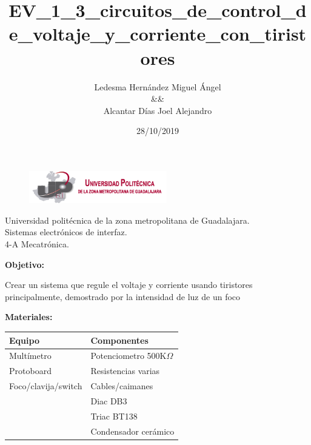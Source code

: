 \documentclass[letterpaper]{article}
\title{EV\_1\_3\_circuitos\_de\_control\_de\_voltaje\_y\_corriente\_con\_tiristores}
\author{Ledesma Hernández Miguel Ángel \\ \&\& \\ Alcantar Días Joel Alejandro}
\date{28/10/2019}
\begin{document}
\begin{figure}[t]
    \includegraphics[width=6cm]{img/logo.png}
\end{figure}
\vspace{2cm}
\maketitle
\vspace{12cm}
\begin{center}
   Universidad politécnica de la zona metropolitana de Guadalajara.\\
Sistemas electrónicos de interfaz.\\
4-A Mecatrónica.\\ 
\end{center}
\newpage

\begin{LARGE}
\textbf{Objetivo:}\\
\end{LARGE}

Crear un sistema que regule el voltaje y corriente usando tiristores principalmente, demostrado por la intensidad de luz de un foco\\


\begin{LARGE}
\textbf{Materiales:}\\
\end{LARGE}

\begin{table}[htbp]
\begin{tabular}{|l|l|}
\hline
{\color[HTML]{3166FF} \textbf{Equipo}} & {\color[HTML]{CB0000} \textbf{Componentes}} \\ \hline
Multímetro                             & Potenciometro 500K$\Omega$                  \\ \hline
Protoboard                             & Resistencias varias                         \\ \hline
Foco/clavija/switch                    & Cables/caimanes                             \\ \hline
                                       & Diac DB3                                    \\ \hline
                                       & Triac BT138                                 \\ \hline
                                       & Condensador cerámico                         \\ \hline
\end{tabular}
\end{table}
\end{document}
